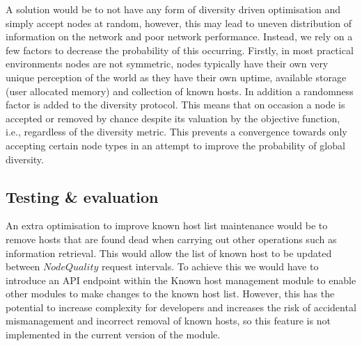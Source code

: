 A solution would be to not have any form of diversity driven optimisation and simply accept nodes at random, however, this may lead to uneven distribution of information on the network and poor network performance. Instead, we rely on a few factors to decrease the probability of this occurring. Firstly, in most practical environments nodes are not symmetric, nodes typically have their own very unique perception of the world as they have their own uptime, available storage (user allocated memory) and collection of known hosts. In addition a randomness factor is added to the diversity protocol. This means that on occasion a node is accepted or removed by chance despite its valuation by the objective function, i.e., regardless of the diversity metric. This prevents a convergence towards only accepting certain node types in an attempt to improve the probability of global diversity.


\subsection{Testing \& evaluation}



An extra optimisation to improve known host list maintenance would be to remove hosts that are found dead when carrying out other operations such as information retrieval. This would allow the list of known host to be updated between $NodeQuality$ request intervals. To achieve this we would have to introduce an API endpoint within the Known host management module to enable other modules to make changes to the known host list. However, this has the potential to increase complexity for developers and increases the risk of accidental mismanagement and incorrect removal of known hosts, so this feature is not implemented in the current version of the module.

